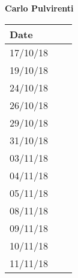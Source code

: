 \documentclass[../main.tex]{subfiles}
\begin{document}
\begin{center}
	{\bf Carlo Pulvirenti}
	\vspace{2mm}

		\begin{tabular}{p{1.3cm}|p{1.8cm}|p{6.7cm}}
			\hline
			\bf Date & \bf \makebox[1.8cm][c]{Hours} & \bf \makebox[6.7cm][c]{Description} \\
			\hline
			17/10/18 & \makebox[1.8cm][c]{2h} & \makebox[6.7cm][c]{Introduction}\\
			19/10/18 & \makebox[1.8cm][c]{3h} & \makebox[6.7cm][c]{Goals, Requirements, Domain assumptions}\\
			24/10/18 & \makebox[1.8cm][c]{4h} & \makebox[6.7cm][c]{Goals, Requirements, Domain assumptions}\\
			26/10/18 & \makebox[1.8cm][c]{2h} & \makebox[6.7cm][c]{Purpose, Scope}\\
			29/10/18 & \makebox[1.8cm][c]{6h} & \makebox[6.7cm][c]{Use Cases}\\
			31/10/18 & \makebox[1.8cm][c]{6h} & \makebox[6.7cm][c]{Use Cases, Scenarios}\\
			03/11/18 & \makebox[1.8cm][c]{4h} & \makebox[6.7cm][c]{Scenarios}\\
			04/11/18 & \makebox[1.8cm][c]{1h} & \makebox[6.7cm][c]{UML Class \& State Machine Diagrams}\\
			05/11/18 & \makebox[1.8cm][c]{4h} & \makebox[6.7cm][c]{Scenarios, Sequence Diagrams}\\
			08/11/18 & \makebox[1.8cm][c]{2h} & \makebox[6.7cm][c]{Sequence Diagramm, Alloy}\\
			09/11/18 & \makebox[1.8cm][c]{2h} & \makebox[6.7cm][c]{Sequence Diagram, Revisioning}\\
			10/11/18 & \makebox[1.8cm][c]{2h} & \makebox[6.7cm][c]{Revisioning}\\
			11/11/18 & \makebox[1.8cm][c]{4h} & \makebox[6.7cm][c]{Revisioning}\\
		\end{tabular}
\end{center}

\vspace{1cm}

\newpage
\end{document}
